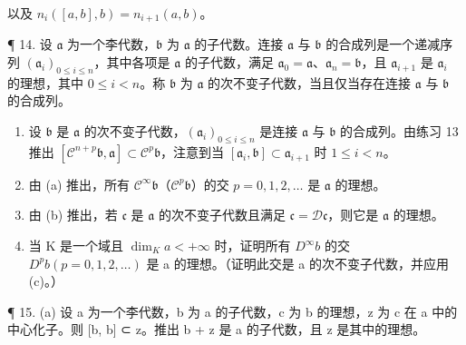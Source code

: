 以及 \(n_{i}([a,b],b)=n_{i+1}(a,b)\)。

¶ 14. 设 \(\mathfrak{a}\) 为一个李代数，\(\mathfrak{b}\) 为 \(\mathfrak{a}\) 的子代数。连接 \(\mathfrak{a}\) 与 \(\mathfrak{b}\) 的合成列是一个递减序列 \((\mathfrak{a}_i)_{0\leqslant i\leqslant n}\)，其中各项是 \(\mathfrak{a}\) 的子代数，满足 \(\mathfrak{a}_0 = \mathfrak{a}\)、\(\mathfrak{a}_n = \mathfrak{b}\)，且 \(\mathfrak{a}_{i+1}\) 是 \(\mathfrak{a}_i\) 的理想，其中 \(0\leqslant i < n\)。称 \(\mathfrak{b}\) 为 \(\mathfrak{a}\) 的次不变子代数，当且仅当存在连接 \(\mathfrak{a}\) 与 \(\mathfrak{b}\) 的合成列。

\begin{enumerate}
\def\labelenumi{(\alph{enumi})}
\item
  设 \(\mathfrak{b}\) 是 \(\mathfrak{a}\) 的次不变子代数，\((\mathfrak{a}_i)_{0\leqslant i\leqslant n}\) 是连接 \(\mathfrak{a}\) 与 \(\mathfrak{b}\) 的合成列。由练习 13 推出 \([\mathcal{C}^{n+p}\mathfrak{b},\mathfrak{a}]\subset\mathcal{C}^{p}\mathfrak{b}\)，注意到当 \([\mathfrak{a}_i,\mathfrak{b}]\subset\mathfrak{a}_{i+1}\) 时 \(1\leqslant i<n\)。
\item
  由 (a) 推出，所有 \(\mathcal{C}^{\infty}\mathfrak{b}\)（\(\mathcal{C}^{p}\mathfrak{b}\)）的交 \(p = 0,1,2,\ldots\) 是 \(\mathfrak{a}\) 的理想。
\item
由 (b) 推出，若 \(\mathfrak{c}\) 是 \(\mathfrak{a}\) 的次不变子代数且满足 \(\mathfrak{c} = \mathcal{D}\mathfrak{c}\)，则它是 \(\mathfrak{a}\) 的理想。
\item
  当 K 是一个域且 \(\dim_{K}a<+\infty\) 时，证明所有 \(D^{\infty}b\) 的交 \(D^{p}b\left(p=0,1,2,\ldots\right)\) 是 a 的理想。（证明此交是 a 的次不变子代数，并应用 (c)。）
\end{enumerate}

¶ 15. (a) 设 a 为一个李代数，b 为 a 的子代数，c 为 b 的理想，z 为 c 在 a 中的中心化子。则 {[}b, b{]} ⊂ z。推出 b + z 是 a 的子代数，且 z 是其中的理想。

